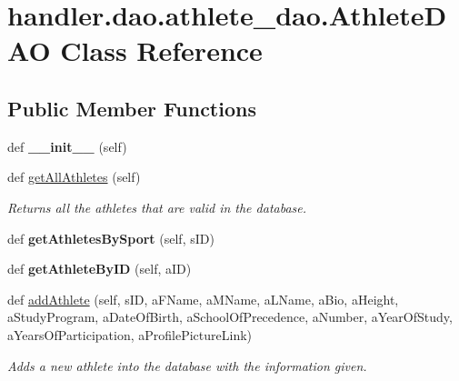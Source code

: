 \hypertarget{classhandler_1_1dao_1_1athlete__dao_1_1_athlete_d_a_o}{}\section{handler.\+dao.\+athlete\+\_\+dao.\+Athlete\+D\+AO Class Reference}
\label{classhandler_1_1dao_1_1athlete__dao_1_1_athlete_d_a_o}
\subsection*{Public Member Functions}
\begin{DoxyCompactItemize}
\item 
\mbox{\label{classhandler_1_1dao_1_1athlete__dao_1_1_athlete_d_a_o_a45e1d4d0fb1e1ab6327de53702dc1cc3}} 
def {\bfseries \+\_\+\+\_\+init\+\_\+\+\_\+} (self)
\item 
def \hyperlink{classhandler_1_1dao_1_1athlete__dao_1_1_athlete_d_a_o_a20c2fea97ed691d3c9459cb8bf13f962}{get\+All\+Athletes} (self)
\begin{DoxyCompactList}\small\item\em Returns all the athletes that are valid in the database. \end{DoxyCompactList}\item 
\mbox{\label{classhandler_1_1dao_1_1athlete__dao_1_1_athlete_d_a_o_a03840784aabb2ecf6fd1117a999cc314}} 
def {\bfseries get\+Athletes\+By\+Sport} (self, s\+ID)
\item 
\mbox{\label{classhandler_1_1dao_1_1athlete__dao_1_1_athlete_d_a_o_a0e7927503dbc9e594eab1b71ccfdcc71}} 
def {\bfseries get\+Athlete\+By\+ID} (self, a\+ID)
\item 
def \hyperlink{classhandler_1_1dao_1_1athlete__dao_1_1_athlete_d_a_o_a8d63542ce2b12f1e736ad2dc718b07cd}{add\+Athlete} (self, s\+ID, a\+F\+Name, a\+M\+Name, a\+L\+Name, a\+Bio, a\+Height, a\+Study\+Program, a\+Date\+Of\+Birth, a\+School\+Of\+Precedence, a\+Number, a\+Year\+Of\+Study, a\+Years\+Of\+Participation, a\+Profile\+Picture\+Link)
\begin{DoxyCompactList}\small\item\em Adds a new athlete into the database with the information given. \end{DoxyCompactList}\item 

\end{DoxyCompactItemize}
